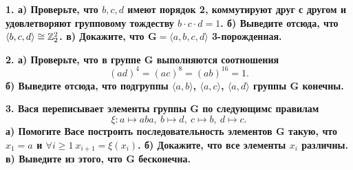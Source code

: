 \documentclass[11pt]{extarticle}
\begin{document}
\begin{landscape}
\begin{multicols}{2}
	\bf{1.} а) Проверьте, что $b, c, d$ имеют порядок 2, коммутируют друг с другом и удовлетворяют групповому тождеству  $b \cdot c \cdot d = 1$. б) Выведите отсюда, что $\langle b, c, d \rangle \cong \mathbb{Z}_{2}^2$. в) Докажите, что $\mathbf{G} = \langle a, b, c, d \rangle$ 3-порожденная. 
	
	\bf{2.} а) Проверьте, что в группе $\mathbf{G}$ выполняются соотношения 
	\[
		(ad)^4 = (ac)^8 = (ab)^{16} = 1.
	\]
	б) Выведите отсюда, что подгруппы $\langle a, b \rangle$, $\langle a, c \rangle$, $\langle a, d \rangle$ группы $\mathbf{G}$ конечны. 

	\bf{3.} Вася переписывает элементы группы $\mathbf{G}$ по следующимс правилам
	\[
		\xi\colon a \mapsto aba, \ b \mapsto d, \ c \mapsto b, \ d \mapsto c.
	\]
	а) Помогите Васе построить последовательность элементов $\mathbf{G}$ такую, что $x_1 = a$ и $\forall i \ge 1 \ x_{i + 1} = \xi(x_{i})$. б) Докажите, что все элементы $x_i$ различны. в) Выведите из этого, что  $\mathbf{G}$ бесконечна.
	

 	

	\end{multicols}
	\end{landscape}
\end{document}
